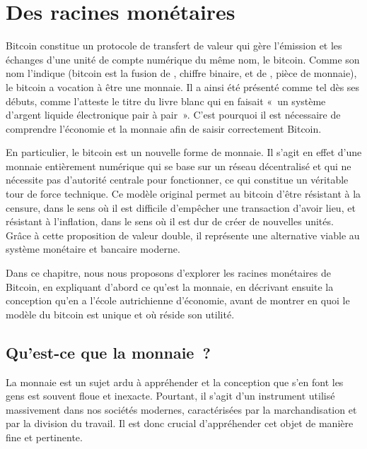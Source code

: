 
\chapter{Des racines monétaires}
\label{ch:3}

Bitcoin constitue un protocole de transfert de valeur qui gère l'émission et les échanges d'une unité de compte numérique du même nom, le bitcoin. Comme son nom l'indique (bitcoin est la fusion de , chiffre binaire, et de , pièce de monnaie), le bitcoin a vocation à être une monnaie. Il a ainsi été présenté comme tel dès ses débuts, comme l'atteste le titre du livre blanc qui en faisait «~un système d'argent liquide électronique pair à pair~». C'est pourquoi il est nécessaire de comprendre l'économie et la monnaie afin de saisir correctement Bitcoin.

En particulier, le bitcoin est un nouvelle forme de monnaie. Il s'agit en effet d'une monnaie entièrement numérique qui se base sur un réseau décentralisé et qui ne nécessite pas d'autorité centrale pour fonctionner, ce qui constitue un véritable tour de force technique. Ce modèle original permet au bitcoin d'être résistant à la censure, dans le sens où il est difficile d'empêcher une transaction d'avoir lieu, et résistant à l'inflation, dans le sens où il est dur de créer de nouvelles unités. Grâce à cette proposition de valeur double, il représente une alternative viable au système monétaire et bancaire moderne.

Dans ce chapitre, nous nous proposons d'explorer les racines monétaires de Bitcoin, en expliquant d'abord ce qu'est la monnaie, en décrivant ensuite la conception qu'en a l'école autrichienne d'économie, avant de montrer en quoi le modèle du bitcoin est unique et où réside son utilité.

\section*{Qu'est-ce que la monnaie~?}

La monnaie est un sujet ardu à appréhender et la conception que s'en font les gens est souvent floue et inexacte. Pourtant, il s'agit d'un instrument utilisé massivement dans nos sociétés modernes, caractérisées par la marchandisation et par la division du travail. Il est donc crucial d'appréhender cet objet de manière fine et pertinente.

